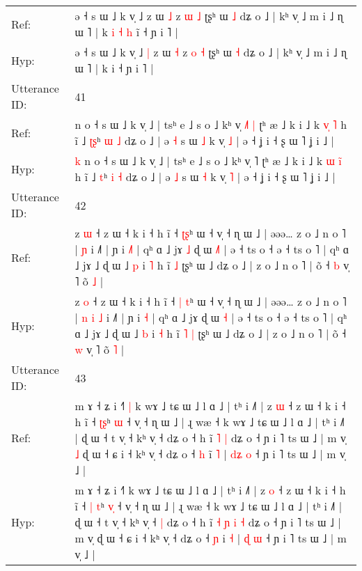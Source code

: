 \documentclass[10pt]{article}
\DeclareRobustCommand{\hl}[1]{{\textcolor{red}{#1}}}
\begin{document}
\begin{longtable}{ll}
Ref: & ə ˧ s ɯ ˩ k v̩ ˩\hl{}\hl{} z ɯ \hl{˩} z \hl{ɯ} \hl{˩} ʈʂʰ ɯ \hl{˩} dʑ o ˩ | kʰ v̩ ˩ m i ˩ ɳ ɯ ˥ | k\hl{ }\hl{i}\hl{ }\hl{˧}\hl{ }\hl{h} i\hl{̃} ˧ ɲ i ˥ |
 \\
Hyp: & ə ˧ s ɯ ˩ k v̩ ˩\hl{ }\hl{|} z ɯ \hl{˧} z \hl{o} \hl{˧} ʈʂʰ ɯ \hl{˧} dʑ o ˩ | kʰ v̩ ˩ m i ˩ ɳ ɯ ˥ | k\hl{}\hl{}\hl{}\hl{}\hl{}\hl{} i\hl{} ˧ ɲ i ˥ |
 \\
\midrule
Utterance ID: & 41 \\
Ref: & \hl{}\hl{}n o ˧ s ɯ ˩ k v̩ ˩ | tsʰ e ˩ s o ˩ kʰ v̩ \hl{˩}˥\hl{ }\hl{|} ʈʰ æ ˩ k i ˩ k \hl{v}\hl{̩}\hl{ }\hl{˥} h ĩ ˩ \hl{ʈ}\hl{ʂ}ʰ \hl{ɯ} \hl{˩} dʑ o ˩ | ə \hl{˧} s ɯ \hl{˩} k v̩ \hl{˩} | ə ˧ ʝ i ˧ ʂ ɯ ˥ ʝ i ˩ |
 \\
Hyp: & \hl{k}\hl{ }n o ˧ s ɯ ˩ k v̩ ˩ | tsʰ e ˩ s o ˩ kʰ v̩ \hl{}˥\hl{}\hl{} ʈʰ æ ˩ k i ˩ k \hl{ɯ}\hl{ }\hl{i}\hl{̃} h ĩ ˩ \hl{}\hl{t}ʰ \hl{i} \hl{˧} dʑ o ˩ | ə \hl{˩} s ɯ \hl{˧} k v̩ \hl{˥} | ə ˧ ʝ i ˧ ʂ ɯ ˥ ʝ i ˩ |
 \\
\midrule
Utterance ID: & 42 \\
Ref: & z \hl{ɯ} ˧ z ɯ ˧ k i ˧ h ĩ ˧ \hl{}\hl{ʈ}\hl{ʂ}ʰ ɯ ˧ v̩ ˧ ɳ ɯ ˩ | əəə… z o ˩ n o ˥ |\hl{}\hl{}\hl{}\hl{} \hl{ɲ} i ˩˥ | ɲ i \hl{˩}\hl{˥} | qʰ ɑ ˩ jɤ\hl{ }\hl{˩} ɖ ɯ \hl{˩}\hl{˥} | ə ˧ ts o ˧ ə ˧ ts o ˥ | qʰ ɑ ˩ jɤ ˩ ɖ ɯ ˩ \hl{p} i \hl{˥} h ĩ\hl{}\hl{} \hl{˩} ʈʂʰ ɯ ˩ dʑ o ˩ | z o ˩ n o ˥ | õ ˧ \hl{b} v̩ ˥ õ \hl{˩} |
 \\
Hyp: & z \hl{o} ˧ z ɯ ˧ k i ˧ h ĩ ˧ \hl{|}\hl{ }\hl{t}ʰ ɯ ˧ v̩ ˧ ɳ ɯ ˩ | əəə… z o ˩ n o ˥ |\hl{ }\hl{n}\hl{ }\hl{i} \hl{˩} i ˩˥ | ɲ i \hl{}\hl{˧} | qʰ ɑ ˩ jɤ\hl{}\hl{} ɖ ɯ \hl{}\hl{˧} | ə ˧ ts o ˧ ə ˧ ts o ˥ | qʰ ɑ ˩ jɤ ˩ ɖ ɯ ˩ \hl{b} i \hl{˧} h ĩ\hl{ }\hl{˥} \hl{|} ʈʂʰ ɯ ˩ dʑ o ˩ | z o ˩ n o ˥ | õ ˧ \hl{w} v̩ ˥ õ \hl{˥} |
 \\
\midrule
Utterance ID: & 43 \\
Ref: & m ɤ ˧ ʑ i ˧˥\hl{ }\hl{|} k wɤ ˩ tɕ ɯ ˩ l ɑ ˩ | tʰ i ˩˥ | z \hl{ɯ} ˧ z ɯ ˧ k i ˧ h ĩ ˧ \hl{}\hl{ʈ}\hl{ʂ}ʰ \hl{}\hl{ɯ} ˧ v̩ ˧ ɳ ɯ ˩ | ɻ wæ ˧ k wɤ ˩ tɕ ɯ ˩ l ɑ ˩ | tʰ i ˩˥ | ɖ ɯ ˧ t v̩ ˧ kʰ v̩ ˧\hl{}\hl{} dʑ o ˧ h ĩ\hl{}\hl{}\hl{}\hl{} \hl{˥} \hl{|} dʑ o ˧ ɲ i ˥ ts ɯ ˩ | m v̩\hl{ }\hl{˩} ɖ ɯ ˧ ɕ i ˧ kʰ v̩ ˧ dʑ o ˧ \hl{h} i\hl{̃} \hl{˥} | \hl{d}\hl{ʑ} \hl{o} ˧ ɲ i ˥ ts ɯ ˩ | m v̩ ˩ |
 \\
Hyp: & m ɤ ˧ ʑ i ˧˥\hl{}\hl{} k wɤ ˩ tɕ ɯ ˩ l ɑ ˩ | tʰ i ˩˥ | z \hl{o} ˧ z ɯ ˧ k i ˧ h ĩ ˧ \hl{|}\hl{ }\hl{t}ʰ \hl{v}\hl{̩} ˧ v̩ ˧ ɳ ɯ ˩ | ɻ wæ ˧ k wɤ ˩ tɕ ɯ ˩ l ɑ ˩ | tʰ i ˩˥ | ɖ ɯ ˧ t v̩ ˧ kʰ v̩ ˧\hl{ }\hl{|} dʑ o ˧ h ĩ\hl{ }\hl{˧}\hl{ }\hl{ɲ} \hl{i} \hl{˧} dʑ o ˧ ɲ i ˥ ts ɯ ˩ | m v̩\hl{}\hl{} ɖ ɯ ˧ ɕ i ˧ kʰ v̩ ˧ dʑ o ˧ \hl{ɲ} i\hl{} \hl{˧} | \hl{}\hl{ɖ} \hl{ɯ} ˧ ɲ i ˥ ts ɯ ˩ | m v̩ ˩ |

\end{longtable}
\end{document}
